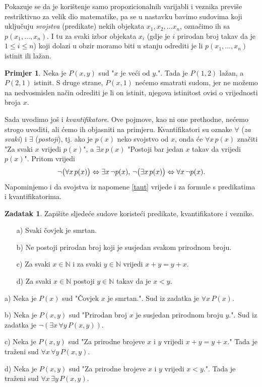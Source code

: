 \documentclass{book}
\let\originalleft\left
\let\originalright\right
\renewcommand{\left}{\mathopen{}\mathclose\bgroup\originalleft}
\renewcommand{\right}{\aftergroup\egroup\originalright}
\renewenvironment{proof}{%
    \vspace{-\parskip}\begin{oldproof}%
    }{%
    \end{oldproof}%
}
\theoremstyle{definition}
\theoremstyle{definition}
\newtheorem{exmp}{Primjer}
\newtheorem{exercise}{Zadatak}
\theoremstyle{remark}
\begin{document}
Pokazuje se da je korištenje samo propozicionalnih varijabli i veznika previše restriktivno za velik dio matematike, pa se u nastavku bavimo sudovima koji uključuju \textit{svojstva} (predikate) nekih objekata $x_1, x_2,\dots x_n$, označimo ih sa $p(x_1, \dots, x_n)$. I tu za svaki izbor objekata $x_i$ (gdje je $i$ prirodan broj takav da je $1\leq i\leq n$) koji dolazi u obzir moramo biti u stanju odrediti je li $p(x_1, \dots, x_n)$ istinit ili lažan. 
\begin{exmp}
Neka je $P(x, y)$ sud "$x$ je veći od $y$.". Tada je $P(1, 2)$ lažan, a $P(2, 1)$ istinit. S druge strane, $P(x, 1)$ nećemo smatrati sudom, jer ne možemo na nedvosmislen način odrediti je li on istinit, njegova istinitost ovisi o vrijednosti broja $x$. 
\end{exmp}
Sada uvodimo još i \textit{kvantifikatore}. Ove pojmove, kao ni one prethodne, nećemo strogo uvoditi, ali ćemo ih objasniti na primjeru. Kvantifikatori su oznake $\forall$ (\textit{za svaki}) i $\exists$ (\textit{postoji}), tj. ako je $p(x)$ neko svojstvo od $x$, onda će $\forall{x}\, p(x)$ značiti "Za svaki $x$ vrijedi $p(x)$", a $\exists{x}\, p(x)$ "Postoji bar jedan $x$ takav da vrijedi $p(x)$". Pritom vrijedi
$$\neg \left(\forall{x}\, p(x)\right)\Leftrightarrow \exists{x}\, \neg p(x), \, \neg \left(\exists{x}\, p(x)\right)\Leftrightarrow \forall{x}\, \neg p(x).$$
Napominjemo i da svojstva iz napomene \ref{taut} vrijede i za formule s predikatima i kvantifikatorima.
\begin{exercise}
Zapišite sljedeće sudove koristeći predikate, kvantifikatore i veznike.
\begin{itemize}
\item[a)] Svaki čovjek je smrtan.
\item[b)] Ne postoji prirodan broj koji je susjedan svakom prirodnom broju.
\item[c)] Za svaki $x\in \mathbb{N}$ i za svaki $y\in \mathbb{N}$ vrijedi $x+y=y+x$.
\item[d)] Za svaki $x\in \mathbb{N}$ postoji $y\in \mathbb{N}$ takav da je $x<y$.
\end{itemize}
\end{exercise}
\begin{proof}[Rješenje]
a) Neka je $P(x)$ sud "Čovjek $x$ je smrtan.". Sud iz zadatka je $\forall{x}\, P(x)$.

b) Neka je $P(x, y)$ sud "Prirodan broj $x$ je susjedan prirodnom broju $y$.". Sud iz zadatka je $\neg(\exists{x}\, \forall{y}\, P(x, y))$.

c) Neka je $P(x, y)$ sud "Za prirodne brojeve $x$ i $y$ vrijedi $x+y=y+x$." Tada je traženi sud $\forall{x}\, \forall{y}\, P(x, y)$.

d) Neka je $P(x, y)$ sud "Za prirodne brojeve $x$ i $y$ vrijedi $x<y$.". Tada je traženi sud $\forall{x}\,\exists{y}\, P(x, y)$.
\end{proof}
\end{document}

